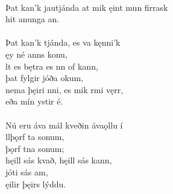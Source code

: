  \\

\bva Þat kan'k jautjánda \hld at mik ęint mun firrask \\%
\ind hit anunga an.\\%

 \\

\bva Þat kan'k tjánda, \hld es va kęnni'k \\%
\ind {}ęy né anns konu, \\%
lt es bętra \hld es nn of kann, \\%
\ind þat fylgir jóða okum, \\%
nema þęiri nni, \hld es mik rmi vęrr, \\%
\ind eða mín ystir é.\\%

 \\

\bva Nú eru áva mál \hld kveðin ávaǫllu í \\%
\ind {}llþǫrf ta sonum, \\%
\ind {}þǫrf tna sonum; \\%
hęill sás kvað, \hld hęill sás kann, \\%
\ind {}jóti sás am, \\%
\ind {}ęilir þęirs lýddu.\footnotemark[50]\\%

 \\
